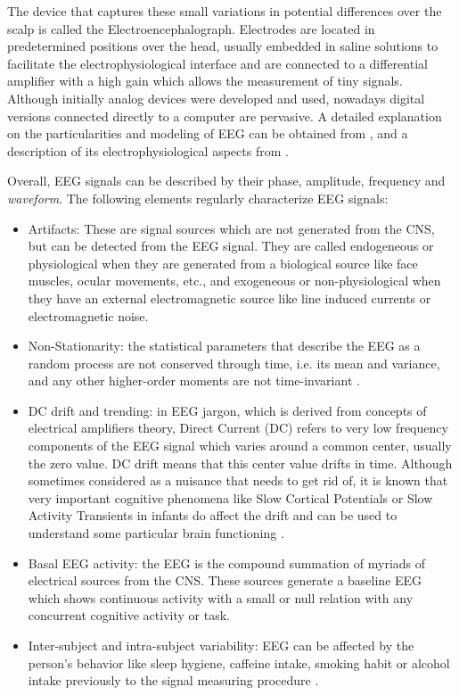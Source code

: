 \documentclass[brainsci,article,submit,moreauthors,pdftex,10pt,a4paper]{mdpi}
\begin{document}
The device that captures these small variations in potential differences over the scalp is called the Electroencephalograph.  Electrodes are located in predetermined positions over the head, usually embedded in saline solutions to facilitate the electrophysiological interface and are connected to a differential amplifier with a high gain which allows the measurement of tiny signals. Although initially analog devices were developed and used, nowadays digital versions connected directly to a computer are pervasive.  A detailed explanation on the particularities and modeling of EEG can be obtained from \citep{Jackson2014}, and a description of its electrophysiological aspects from \citep{Haberman2012}.

Overall, EEG signals can be described by their phase, amplitude,  frequency and \textit{waveform}.  The following elements regularly  characterize EEG signals:

\begin{itemize}
\item Artifacts:  These are signal sources which are not generated from the CNS, but can be detected from the EEG signal.  They are called endogeneous or physiological when they are generated from a biological source like face muscles, ocular movements, etc., and exogeneous or non-physiological when they have an external electromagnetic source like line induced currents or electromagnetic noise\citep{Weeda2012}.
\item Non-Stationarity: the statistical parameters that describe the EEG as a random process are not conserved through time, i.e. its mean and variance, and any other higher-order moments are not time-invariant \citep{Jansen1991}.
\item DC drift and trending: in EEG jargon, which is derived from concepts of electrical amplifiers theory, Direct Current (DC) refers to very low frequency components of the EEG signal which varies around a common center, usually the zero value.  DC drift means that this center value drifts in time.  Although sometimes considered as a nuisance that needs to get rid of, it is known that very important cognitive phenomena like Slow Cortical Potentials or Slow Activity Transients in infants do affect the drift and can be used to understand some particular brain functioning \cite{Schomer2010}.
\item Basal EEG activity: the EEG is the compound summation of myriads of electrical sources from the CNS.  These sources generate a baseline EEG which shows continuous activity with a small or null relation with any concurrent cognitive activity or task.
\item Inter-subject and intra-subject variability: EEG can be affected by the person's behavior like sleep hygiene, caffeine intake, smoking habit or alcohol intake previously to the signal measuring procedure \citep{Farzan2017}.
\end{itemize}
\end{document}

